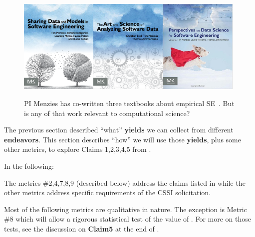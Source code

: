 
\begin{figure}
\includegraphics[width=1.45in]{fig/book1.png}\includegraphics[width=1.45in]{fig/book2.png}\includegraphics[width=1.45in]{fig/book3.jpg}
\caption{PI Menzies has co-written    three textbooks about 
empirical SE~\cite{menzies2014sharing,bird2015art,menzies2016perspectives}. But is any of that work relevant to
 computational science?}\label{fig:books}
\end{figure}


The previous section described ``what''  {\bf yields} we can collect from  different {\bf endeavors}.
This section describes ``how'' we will use those {\bf yields}, plus some other metrics,
to explore  Claims 1,2,3,4,5 from .

In the following:
\bi
\item
  The metrics \#2,4,7,8,9 (described below)  address the claims listed in  while the
 other metrics address   specific requirements
of the CSSI solicitation.
\item
Most of the following metrics are qualitative in nature. The exception is Metric \#8
which will allow a rigorous statistical test of the value of {\IT}. For more on those tests,
see the discussion on {\bf Claim5} at the end of . \ei
\noindent
